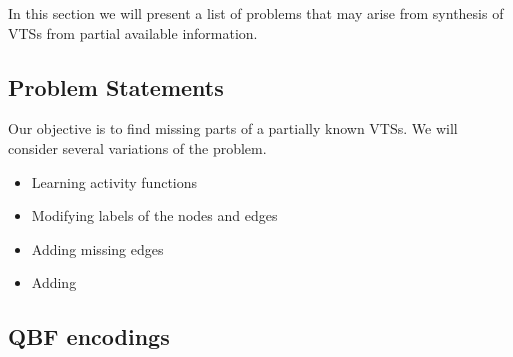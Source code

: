 In this section we will present a list of problems that may arise from
synthesis of VTSs from partial available information.

\subsection{Problem Statements}


Our objective is to find missing parts of a partially known VTSs.
%
We will consider several variations of the problem.
%
\begin{itemize}
\item Learning activity functions
\item Modifying labels of the nodes and edges
\item Adding missing edges
\item Adding
\end{itemize}


\subsection{QBF encodings}




